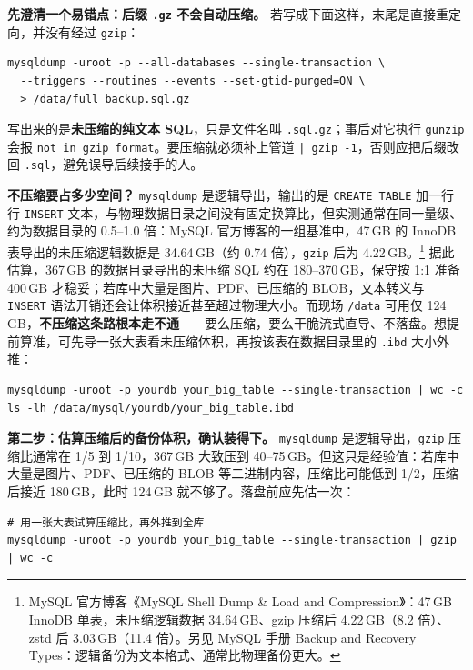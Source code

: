 \documentclass[12pt,UTF8]{ctexbook}
\begin{document}
\textbf{先澄清一个易错点：后缀 \texttt{.gz} 不会自动压缩。} 若写成下面这样，末尾是直接重定向，并没有经过 \texttt{gzip}：

\begin{lstlisting}
mysqldump -uroot -p --all-databases --single-transaction \
  --triggers --routines --events --set-gtid-purged=ON \
  > /data/full_backup.sql.gz
\end{lstlisting}

写出来的是\textbf{未压缩的纯文本 SQL}，只是文件名叫 \texttt{.sql.gz}；事后对它执行 \texttt{gunzip} 会报 \texttt{not in gzip format}。要压缩就必须补上管道 \texttt{| gzip -1}，否则应把后缀改回 \texttt{.sql}，避免误导后续接手的人。

\textbf{不压缩要占多少空间？} \texttt{mysqldump} 是逻辑导出，输出的是 \texttt{CREATE TABLE} 加一行行 \texttt{INSERT} 文本，与物理数据目录之间没有固定换算比，但实测通常在同一量级、约为数据目录的 0.5--1.0 倍：MySQL 官方博客的一组基准中，47\,GB 的 InnoDB 表导出的未压缩逻辑数据是 34.64\,GB（约 0.74 倍），\texttt{gzip} 后为 4.22\,GB。\footnote{MySQL 官方博客《MySQL Shell Dump \& Load and Compression》：47\,GB InnoDB 单表，未压缩逻辑数据 34.64\,GB、gzip 压缩后 4.22\,GB（8.2 倍）、zstd 后 3.03\,GB（11.4 倍）。另见 MySQL 手册 Backup and Recovery Types：逻辑备份为文本格式、通常比物理备份更大。} 据此估算，367\,GB 的数据目录导出的未压缩 SQL 约在 180--370\,GB，保守按 1:1 准备 400\,GB 才稳妥；若库中大量是图片、PDF、已压缩的 BLOB，文本转义与 \texttt{INSERT} 语法开销还会让体积接近甚至超过物理大小。而现场 \texttt{/data} 可用仅 124\,GB，\textbf{不压缩这条路根本走不通}——要么压缩，要么干脆流式直导、不落盘。想提前算准，可先导一张大表看未压缩体积，再按该表在数据目录里的 \texttt{.ibd} 大小外推：

\begin{lstlisting}
mysqldump -uroot -p yourdb your_big_table --single-transaction | wc -c
ls -lh /data/mysql/yourdb/your_big_table.ibd
\end{lstlisting}

\textbf{第二步：估算压缩后的备份体积，确认装得下。} \texttt{mysqldump} 是逻辑导出，\texttt{gzip} 压缩比通常在 1/5 到 1/10，367\,GB 大致压到 40--75\,GB。但这只是经验值：若库中大量是图片、PDF、已压缩的 BLOB 等二进制内容，压缩比可能低到 1/2，压缩后接近 180\,GB，此时 124\,GB 就不够了。落盘前应先估一次：

\begin{lstlisting}
# 用一张大表试算压缩比，再外推到全库
mysqldump -uroot -p yourdb your_big_table --single-transaction | gzip | wc -c
\end{lstlisting}
\end{document}
